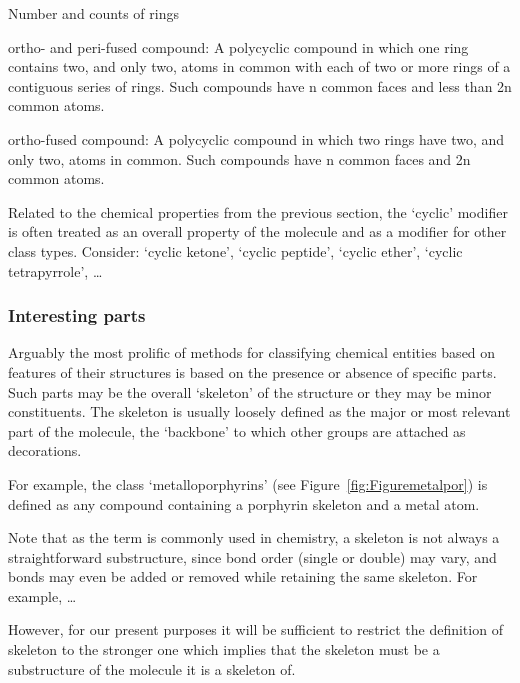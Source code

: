 \documentclass[10pt]{bmc_article}
\newenvironment{bmcformat}{\baselineskip20pt\sloppy\setboolean{publ}{false}}{\baselineskip20pt\sloppy}
\begin{document}
\begin{bmcformat}
Number and counts of rings


ortho- and peri-fused compound: A polycyclic compound in which one ring contains two, and only two, atoms in common with each of two or more rings of a contiguous series of rings. Such compounds have n common faces and less than 2n common atoms.

ortho-fused compound: A polycyclic compound in which two rings have two, and only two, atoms in common. Such compounds have n common faces and 2n common atoms.


Related to the chemical properties from the previous section, the `cyclic' modifier is often treated as an overall property of the molecule and as a modifier for other class types. Consider: `cyclic ketone', `cyclic peptide', `cyclic ether', `cyclic tetrapyrrole', \ldots


\subsubsection*{Interesting parts}

Arguably the most prolific of methods for classifying chemical entities based on features of their structures is based on the presence or absence of specific parts.  Such parts may be the overall `skeleton' of the structure or they may be minor constituents. The skeleton is usually loosely defined as the major or most relevant part of the molecule, the `backbone' to which other groups are attached as decorations. 

For example, the class `metalloporphyrins' (see Figure~\ref{fig:Figuremetalpor}) is defined as any compound containing a porphyrin skeleton and a metal atom. 

Note that as the term is commonly used in chemistry, a skeleton is not always a straightforward substructure, since bond order (single or double) may vary, and bonds may even be added or removed while retaining the same skeleton. For example, \ldots

However, for our present purposes it will be sufficient to restrict the definition of skeleton to the stronger one which implies that the skeleton must be a substructure of the molecule it is a skeleton of.






\end{bmcformat}
\end{document}
